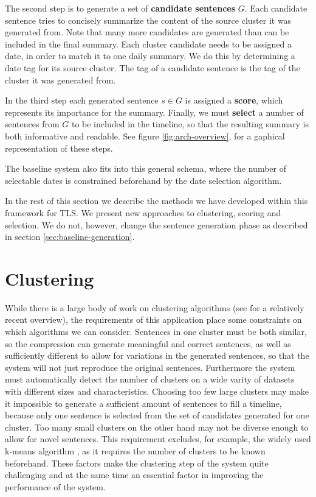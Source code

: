 \documentclass[a4paper,BCOR=10mm]{report}
\numberwithin{lemma}{chapter}
\numberwithin{definition}{chapter}
\begin{document}
The second step is to generate a set of \textbf{candidate sentences} $G$. Each candidate sentence tries to concisely summarize the content of the source cluster it was generated from. Note that many more candidates are generated than can be included in the final summary. Each cluster candidate needs to be assigned a date, in order to match it to one daily summary. We do this by determining a date tag for its source cluster. The tag of a candidate sentence is the tag of the cluster it was generated from.

In the third step each generated sentence $s \in G$ is assigned a \textbf{score}, which represents its importance for the summary.
Finally, we must \textbf{select} a number of sentences from $G$ to be included in the timeline, so that the resulting summary is both informative and readable. See figure \ref{fig:arch-overview}, for a gaphical representation of these steps.

The baseline system also fits into this general schema, where the number of selectable dates is constrained beforehand by the date selection algorithm.

In the rest of this section we describe the methods we have developed within this framework for TLS. We present new approaches to clustering, scoring and selection. We do not, however, change the sentence generation phase as described in section \ref{sec:baseline-generation}.

\section{Clustering}

While there is a large body of work on clustering algorithms (see \citet{xu} for a relatively recent overview), the requirements of this application place some constraints on which algorithms we can consider. Sentences in one cluster must be both similar, so the compression can generate meaningful and correct sentences, as well as sufficiently different to allow for variations in the generated sentences, so that the system will not just reproduce the original sentences.
Furthermore the system must automatically detect the number of clusters on a wide varity of datasets with different sizes and characteristics.
Choosing too few large clusters may make it impossible to generate a sufficient amount of sentences to fill a timeline, because only one sentence is selected from the set of candidates generated for one cluster. Too many small clusters on the other hand may not be diverse enough to allow for novel sentences.
This requirement excludes, for example, the widely used k-means algorithm \citet{kmeans}, as it requires the number of clusters to be known beforehand.
These factors make the clustering step of the system quite challenging and at the same time an essential factor in improving the performance of the system.
\end{document}
